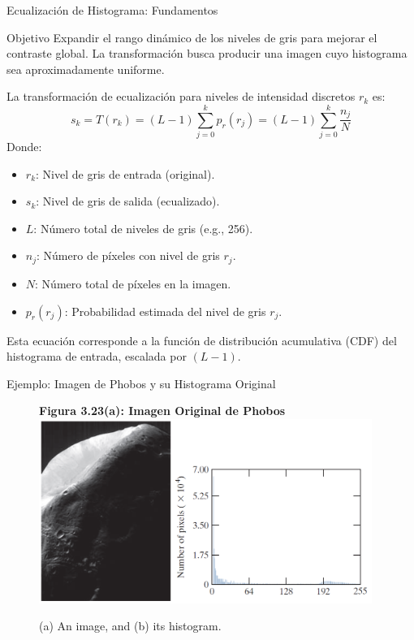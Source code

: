 \documentclass{beamer}
\begin{document}
\begin{frame}{Ecualización de Histograma: Fundamentos}\footnotesize
    \begin{block}{Objetivo}
        Expandir el rango dinámico de los niveles de gris para mejorar el contraste global. La transformación busca producir una imagen cuyo histograma sea aproximadamente uniforme.
    \end{block}
    La transformación de ecualización para niveles de intensidad discretos $r_k$ es:
    \begin{equation}
        s_k = T(r_k) = (L-1) \sum_{j=0}^{k} p_r(r_j) = (L-1) \sum_{j=0}^{k} \frac{n_j}{N} \label{eq:hist_eq}
    \end{equation}
    Donde:
    \begin{itemize}
        \item $r_k$: Nivel de gris de entrada (original).
        \item $s_k$: Nivel de gris de salida (ecualizado).
        \item $L$: Número total de niveles de gris (e.g., 256).
        \item $n_j$: Número de píxeles con nivel de gris $r_j$.
        \item $N$: Número total de píxeles en la imagen.
        \item $p_r(r_j)$: Probabilidad estimada del nivel de gris $r_j$.
    \end{itemize}
    Esta ecuación corresponde a la función de distribución acumulativa (CDF) del histograma de entrada, escalada por $(L-1)$.
\end{frame}

\begin{frame}{Ejemplo: Imagen de Phobos y su Histograma Original}
    \begin{figure}
                \textbf{Figura 3.23(a): Imagen Original de Phobos}
            \includegraphics[width=\linewidth, height=6cm, keepaspectratio]{figuras/Fig_3_23.png}
            \caption{(a) An image, and (b) its histogram.}
    \end{figure}
\end{frame}
\end{document}
